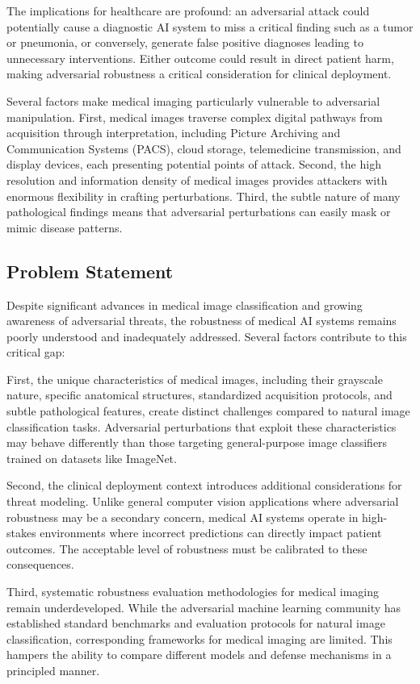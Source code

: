 \documentclass[12pt,a4paper]{article}
\begin{document}
The implications for healthcare are profound: an adversarial attack could potentially cause a diagnostic AI system to miss a critical finding such as a tumor or pneumonia, or conversely, generate false positive diagnoses leading to unnecessary interventions. Either outcome could result in direct patient harm, making adversarial robustness a critical consideration for clinical deployment.

Several factors make medical imaging particularly vulnerable to adversarial manipulation. First, medical images traverse complex digital pathways from acquisition through interpretation, including Picture Archiving and Communication Systems (PACS), cloud storage, telemedicine transmission, and display devices, each presenting potential points of attack. Second, the high resolution and information density of medical images provides attackers with enormous flexibility in crafting perturbations. Third, the subtle nature of many pathological findings means that adversarial perturbations can easily mask or mimic disease patterns.

\subsection{Problem Statement}

Despite significant advances in medical image classification and growing awareness of adversarial threats, the robustness of medical AI systems remains poorly understood and inadequately addressed. Several factors contribute to this critical gap:

First, the unique characteristics of medical images, including their grayscale nature, specific anatomical structures, standardized acquisition protocols, and subtle pathological features, create distinct challenges compared to natural image classification tasks. Adversarial perturbations that exploit these characteristics may behave differently than those targeting general-purpose image classifiers trained on datasets like ImageNet.

Second, the clinical deployment context introduces additional considerations for threat modeling. Unlike general computer vision applications where adversarial robustness may be a secondary concern, medical AI systems operate in high-stakes environments where incorrect predictions can directly impact patient outcomes. The acceptable level of robustness must be calibrated to these consequences.

Third, systematic robustness evaluation methodologies for medical imaging remain underdeveloped. While the adversarial machine learning community has established standard benchmarks and evaluation protocols for natural image classification, corresponding frameworks for medical imaging are limited. This hampers the ability to compare different models and defense mechanisms in a principled manner.
\end{document}
